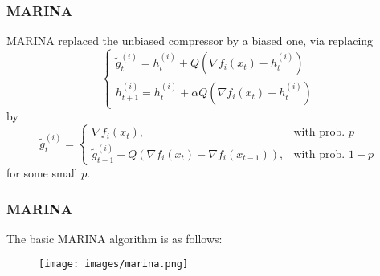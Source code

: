 
\begin{frame}
\frametitle{MARINA}

MARINA \cite{gorbunov2021marina} replaced the unbiased compressor by a {\color{red}biased} one, via replacing
\begin{equation*}
\begin{cases}
\widetilde{g}^{(i)}_t = h^{(i)}_t + Q(\nabla f_i(x_t) - h^{(i)}_t) \\
h^{(i)}_{t+1} = h^{(i)}_t + \alpha Q(\nabla f_i(x_t) - h^{(i)}_t)
\end{cases}
\end{equation*}
by
\begin{equation*}
\widetilde{g}^{(i)}_t = 
\begin{cases}
\nabla f_i(x_t), & \text{with prob. } p \\
\widetilde{g}^{(i)}_{t-1} + Q(\nabla f_i(x_t) - \nabla f_i(x_{t-1})), & \text{with prob. } 1-p
\end{cases}
\end{equation*}
for some small $p$.



\end{frame}


\begin{frame}
\frametitle{MARINA}

The basic MARINA algorithm is as follows:

\begin{figure}
    \centering
    \texttt{[image: images/marina.png]}
\end{figure}

\end{frame}


